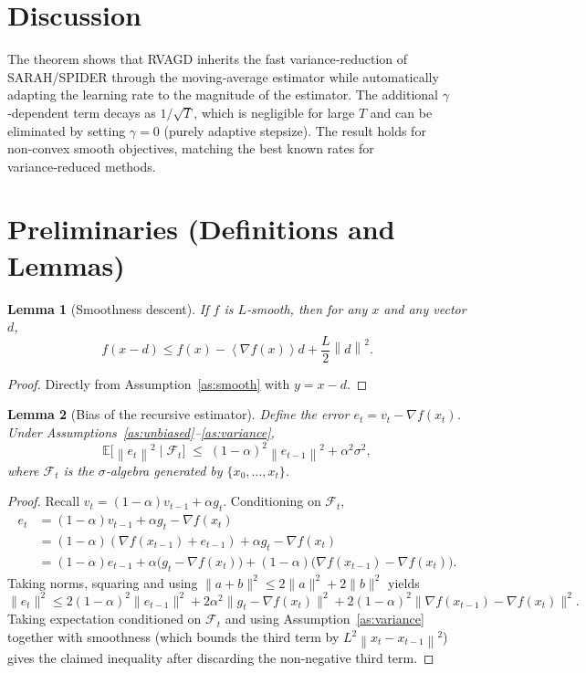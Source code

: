 \documentclass{article}
\newtheorem{lemma}{Lemma}
\newcommand{\E}{\mathbb{E}}
\newcommand{\norm}[1]{\left\|#1\right\|}
\newcommand{\inner}[1]{\left\langle#1\right\rangle}
\begin{document}
\section*{Discussion}
The theorem shows that RVAGD inherits the fast variance‑reduction of SARAH/SPIDER through the moving‑average estimator while automatically adapting the learning rate to the magnitude of the estimator. The additional $\gamma$‑dependent term decays as $1/\sqrt{T}$, which is negligible for large $T$ and can be eliminated by setting $\gamma=0$ (purely adaptive stepsize). The result holds for non‑convex smooth objectives, matching the best known rates for variance‑reduced methods.

\newpage
\section*{Preliminaries (Definitions and Lemmas)}
\begin{lemma}[Smoothness descent]\label{lem:smooth}
If $f$ is $L$‑smooth, then for any $x$ and any vector $d$,
\[
f(x-d)\le f(x)-\inner{\nabla f(x)}{d}+\frac{L}{2}\norm{d}^{2}.
\]
\end{lemma}
\begin{proof}
Directly from Assumption~\ref{as:smooth} with $y=x-d$.
\end{proof}

\begin{lemma}[Bias of the recursive estimator]\label{lem:bias}
Define the error $e_{t}=v_{t}-\nabla f(x_{t})$. Under Assumptions~\ref{as:unbiased}–\ref{as:variance},
\[
\E\bigl[\norm{e_{t}}^{2}\mid\mathcal{F}_{t}\bigr]
\;\le\;
(1-\alpha)^{2}\norm{e_{t-1}}^{2}+\alpha^{2}\sigma^{2},
\]
where $\mathcal{F}_{t}$ is the $\sigma$‑algebra generated by $\{x_{0},\dots,x_{t}\}$.
\end{lemma}
\begin{proof}
Recall $v_{t}=(1-\alpha)v_{t-1}+\alpha g_{t}$. Conditioning on $\mathcal{F}_{t}$,
\[
\begin{aligned}
e_{t}
&= (1-\alpha)v_{t-1}+\alpha g_{t}-\nabla f(x_{t})\\
&= (1-\alpha)(\nabla f(x_{t-1})+e_{t-1})+\alpha g_{t}-\nabla f(x_{t})\\
&= (1-\alpha)e_{t-1}+\alpha\bigl(g_{t}-\nabla f(x_{t})\bigr)+(1-\alpha)\bigl(\nabla f(x_{t-1})-\nabla f(x_{t})\bigr).
\end{aligned}
\]
Taking norms, squaring and using $\|a+b\|^{2}\le 2\|a\|^{2}+2\|b\|^{2}$ yields
\[
\|e_{t}\|^{2}\le 2(1-\alpha)^{2}\|e_{t-1}\|^{2}+2\alpha^{2}\|g_{t}-\nabla f(x_{t})\|^{2}+2(1-\alpha)^{2}\|\nabla f(x_{t-1})-\nabla f(x_{t})\|^{2}.
\]
Taking expectation conditioned on $\mathcal{F}_{t}$ and using Assumption~\ref{as:variance} together with smoothness (which bounds the third term by $L^{2}\norm{x_{t}-x_{t-1}}^{2}$) gives the claimed inequality after discarding the non‑negative third term.
\end{proof}
\end{document}

